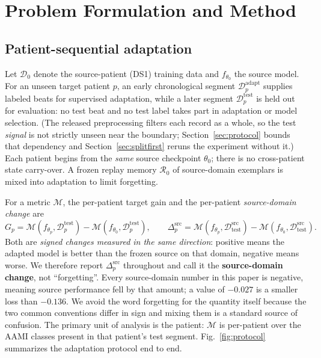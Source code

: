 \section{Problem Formulation and Method}
\label{sec:method}

\subsection{Patient-sequential adaptation}

Let $\mathcal{D}_0$ denote the source-patient (DS1) training data and
$f_{\theta_0}$ the source model. For an unseen target patient $p$, an early
chronological segment $\mathcal{D}^{\mathrm{adapt}}_p$ supplies labeled beats
for supervised adaptation, while a later segment $\mathcal{D}^{\mathrm{test}}_p$
is held out for evaluation: no test beat and no test label takes part in
adaptation or model selection. (The released preprocessing filters each record
as a whole, so the test \emph{signal} is not strictly unseen near the boundary;
Section~\ref{sec:protocol} bounds that dependency and Section~\ref{sec:splitfirst}
reruns the experiment without it.) Each patient begins from the \emph{same}
source checkpoint $\theta_0$; there is no cross-patient state carry-over. A
frozen replay memory $\mathcal{R}_0$ of source-domain exemplars is mixed into
adaptation to limit forgetting.

For a metric $\mathcal{M}$, the per-patient target gain and the per-patient
\emph{source-domain change} are
\begin{equation}
G_p =
\mathcal{M}\!\left(f_{\theta_p},\mathcal{D}^{\mathrm{test}}_p\right)
-\mathcal{M}\!\left(f_{\theta_0},\mathcal{D}^{\mathrm{test}}_p\right),
\qquad
\Delta^{\mathrm{src}}_p =
\mathcal{M}\!\left(f_{\theta_p},\mathcal{D}^{\mathrm{src}}_{\mathrm{test}}\right)
-\mathcal{M}\!\left(f_{\theta_0},\mathcal{D}^{\mathrm{src}}_{\mathrm{test}}\right).
\label{eq:gain_and_srcchange}
\end{equation}
Both are \emph{signed changes measured in the same direction}: positive means the
adapted model is better than the frozen source on that domain, negative means
worse. We therefore report $\Delta^{\mathrm{src}}_p$ throughout and call it the
\textbf{source-domain \macrof{} change}, not ``forgetting''. Every source-domain
number in this paper is negative, meaning source performance fell by that amount;
a value of $-0.027$ is a smaller loss than $-0.136$. We avoid the word forgetting
for the quantity itself because the two common conventions differ in sign and
mixing them is a standard source of confusion.
The primary unit of analysis is the patient: $\mathcal{M}$ is per-patient
\macrof{} over the AAMI classes present in that patient's test segment.
Fig.~\ref{fig:protocol} summarizes the adaptation protocol end to end.

